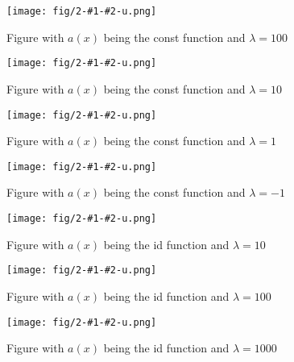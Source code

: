 \documentclass[a4paper,11pt]{article}
\begin{document}



\newcommand{\genfig}[2]{
    \centering
    \begin{figure}
      \texttt{[image: fig/2-\#1-\#2-u.png]}
      \caption{Figure with \ensuremath{a(x)} being the #1 function and
    \ensuremath{\lambda = #2}}
      \label{fig:#1-#2}
    \end{figure}
}


\genfig{const}{100}
\genfig{const}{10}
\genfig{const}{1}
\genfig{const}{-1}
\genfig{id}{10}
\genfig{id}{100}
\genfig{id}{1000}










\end{document}
